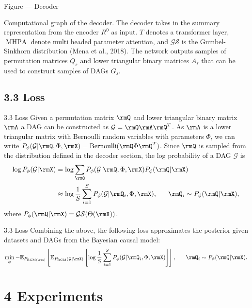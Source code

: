 \documentclass[aspectratio=169,10pt]{beamer}
\begin{document}
\begin{frame}{Figure --- Decoder}
{}

\vspace{0.2cm}
{\footnotesize Computational graph of the decoder. The decoder takes in the summary representation from the encoder $R^0$ as input. $T$ denotes a transformer layer, $\operatorname{MHPA}$ denote multi headed parameter attention, and $\mathcal{GS}$ is the Gumbel-Sinkhorn distribution (Mena et al., 2018). The network outputs samples of permutation matrices $Q_s$ and lower triangular binary matrices $A_s$ that can be used to construct samples of DAGs $G_s$.}
\end{frame}

\subsection{3.3 Loss}

\begin{frame}{3.3 Loss}
\small
Given a permutation matrix $\rmQ$ and lower triangular binary matrix $\rmA$ a DAG can be constructed as $\mathcal{G} = \rmQ \rmA \rmQ^T$. As $\rmA$ is a lower triangular matrix with Bernoulli random variables with parameters $\Phi$, we can write $P_{\phi}(\mathcal{G}| \rmQ, \Phi, \rmX) = \operatorname{Bernoulli}(\rmQ \Phi \rmQ^T)$. Since $\rmQ$ is sampled from the distribution defined in the decoder section, the log probability of a DAG $\mathcal{G}$ is
\begin{align*}
    \log P_{\phi}(\mathcal{G}| \rmX) &= \log \sum_{\rmQ}P_{\phi}(\mathcal{G}| \rmQ, \Phi, \rmX) P_{\phi}(\rmQ|\rmX) \\
    &\approx \log \frac{1}{S} \sum_{i=1}^SP_{\phi}(\mathcal{G}| \rmQ_i, \Phi, \rmX), \ \ \ \ \ \rmQ_i \sim P_{\phi}(\rmQ|\rmX),
\end{align*}
where $P_{\phi}(\rmQ|\rmX) = \mathcal{GS}(\Theta(\rmX))$.
\end{frame}

\begin{frame}{3.3 Loss}
Combining the above, the following loss approximates the posterior given datasets and DAGs from the Bayesian causal model:
\begin{align*}
    \min_{\phi} - \mathbb{E}_{P_{\text{BCM}(\rmX)}} \left[ \mathbb{E}_{P_{\text{BCM}}(\mathcal{G}| \rmX)} \left[  \log \frac{1}{S} \sum_{i=1}^SP_{\phi}(\mathcal{G}| \rmQ_i, \Phi, \rmX)  \right] \right], \ \ \ \ \  \rmQ_i \sim P_{\phi}(\rmQ|\rmX).
\end{align*}
\end{frame}

\section{4 Experiments}
\end{document}
